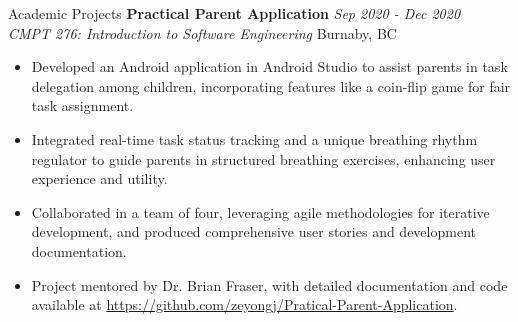 \documentclass{resume} %
\begin{document}
\begin{rSection}{Academic Projects}
{\bf Practical Parent Application} \hfill {\em Sep 2020 - Dec 2020} 
\\{\textit{CMPT 276: Introduction to Software Engineering} \hfill {Burnaby, BC}}
\begin{itemize}
    \vspace{-0.2cm}\item Developed an Android application in Android Studio to assist parents in task delegation among children, incorporating features like a coin-flip game for fair task assignment.
    \vspace{-0.2cm}\item Integrated real-time task status tracking and a unique breathing rhythm regulator to guide parents in structured breathing exercises, enhancing user experience and utility.
    \vspace{-0.2cm}\item Collaborated in a team of four, leveraging agile methodologies for iterative development, and produced comprehensive user stories and development documentation.
    \vspace{-0.2cm}\item Project mentored by Dr. Brian Fraser, with detailed documentation and code available at \url{https://github.com/zeyongj/Pratical-Parent-Application}.
\end{itemize}



\end{rSection}
\end{document}

